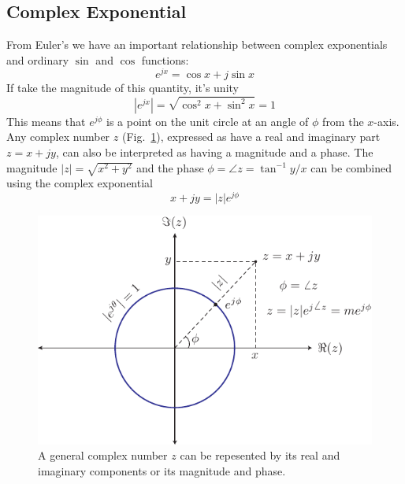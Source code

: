 \subsection{Complex Exponential}
From Euler's we have an important relationship between complex exponentials and ordinary $\sin$ and $\cos$ functions:
    \begin{equation}
        e^{j x} = \cos x + j \sin x
    \end{equation}
If take the magnitude of this quantity, it's unity
    \begin{equation}
        | e^{j x} | = \sqrt{\cos^2 x +  \sin^2 x}  = 1
    \end{equation}
This means that $e^{j\phi}$ is a point on the unit circle at an angle of $\phi$ from the $x$-axis. 
Any complex number $z$ (Fig.~\ref{fig:complex}), expressed as have a real and imaginary part $ z = x + j y$, can also be interpreted as having a magnitude and a phase.  The magnitude  $|z| = \sqrt{x^2 + y^2}$ and the phase $\phi = \angle z = \tan^{-1} y/x$ can be combined using the complex exponential
    \begin{equation}
        x + j y = |z| e^{j\phi}
    \end{equation}
\begin{figure}[tb]
\centering
\includegraphics[width=.6\columnwidth]{complex}
\caption{A general complex number $z$ can be repesented by its real and imaginary components or its magnitude and phase. } \label{fig:complex}
\end{figure}

